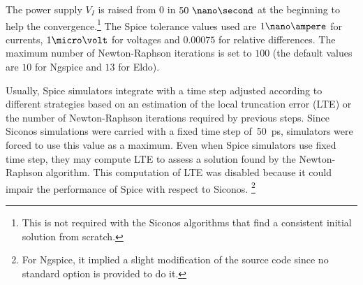 The power supply $V_I$ is raised from 0 in $50~\nano\second$ at the beginning to help the convergence.\footnote{This is
not required with the {\sc Siconos} algorithms that find a consistent initial solution from scratch.}
The {\sc Spice} tolerance values used are $1\nano\ampere$ for currents, $1\micro\volt$ for voltages and $0.00075$ for relative differences.
The maximum number of Newton-Raphson iterations is set to $100$ (the default values are $10$ for
{\sc Ngspice} and $13$ for {\sc Eldo}).

Usually, {\sc Spice} simulators integrate with a time step adjusted according to different strategies based on an estimation
of the local truncation error (LTE) or the number of Newton-Raphson iterations required by previous steps.
Since {\sc Siconos} simulations were carried with a fixed time step of~50~ps, simulators were forced to use this value as a maximum.
Even when {\sc Spice} simulators use fixed time step, they may compute LTE to assess a solution found by the Newton-Raphson
algorithm. This computation of LTE was disabled because it could impair the performance of {\sc Spice} with respect to {\sc Siconos}.
\footnote{For {\sc Ngspice}, it implied a slight modification of the source code since no standard option is provided to do it.}

